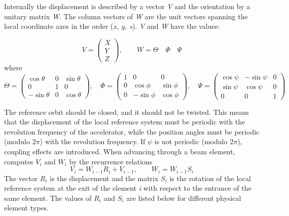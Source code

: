 Internally the displacement is described by a vector \textit{V} and the
orientation by a unitary matrix \textit{W}. The column vectors of
\textit{W} are the unit vectors spanning  the local coordinate axes in
the order (\textit{x, y, s}). \textit{V} and \textit{W} have the values:  

\begin{equation}
V =
 \begin{pmatrix}
  X \\
  Y \\
  Z
 \end{pmatrix}
, \qquad
W=\Theta \quad \Phi \quad \Psi
\end{equation}
 where 
\begin{equation}
\Theta =
 \begin{pmatrix}
  \cos \theta  & 0 &  \sin \theta \\
  0            & 1 &  0 \\
  -\sin \theta & 0 &  \cos \theta
 \end{pmatrix}
, \quad
\Phi =
 \begin{pmatrix}
  1 & 0          &  0 \\
  0 & \cos \phi  &  \sin \phi \\
  0 & -\sin \phi &  \cos \phi
 \end{pmatrix}
, \quad
\Psi =
 \begin{pmatrix}
  \cos \psi &  -\sin \psi & 0 \\
  \sin \psi &  \cos \psi  & 0 \\
  0	    &	0	  & 1 
 \end{pmatrix}
\end{equation}

The reference orbit should be closed, and it should not be twisted. 
This means that the displacement of the local reference system must be
periodic with the revolution frequency of the accelerator, while the
position angles must be periodic (modulo $2\pi$) with the revolution
frequency. If $\psi$ is not periodic (modulo $2\pi$), coupling effects are
introduced. 
When advancing through a beam element, \madx computes
$V_i$ and $W_i$ by the recurrence relations  
\begin{equation}
   V_i=W_{i-1}R_i+V_{i-1},
   \qquad
   W_i=W_{i-1}S_i
\end{equation}
The vector $R_i$ is the displacement and the matrix $S_i$ is the
rotation of the local reference system  at the exit of the element
\textit{i} with respect to the entrance of the same element. The values
of $R_i$ and $S_i$ are listed below for different physical element types.  


